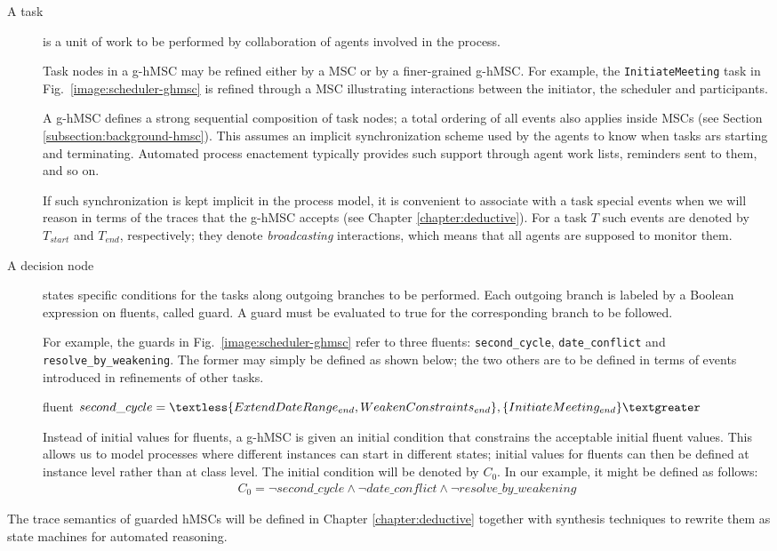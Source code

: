 \begin{description}

\item[A task] is a unit of work to be performed by collaboration of agents involved in the process. 

Task nodes in a g-hMSC may be refined either by a MSC or by a finer-grained g-hMSC. For example, the \texttt{InitiateMeeting} task in Fig.~\ref{image:scheduler-ghmsc} is refined through a MSC illustrating interactions between the initiator, the scheduler and participants. 

A g-hMSC defines a strong sequential composition of task nodes; a total ordering of all events also applies inside MSCs (see Section \ref{subsection:background-hmsc}). This assumes an implicit synchronization scheme used by the agents to know when tasks ars starting and terminating. Automated process enactement typically provides such support through agent work lists, reminders sent to them, and so on. 

If such synchronization is kept implicit in the process model, it is convenient to associate with a task special events when we will reason in terms of the traces that the g-hMSC accepts (see Chapter \ref{chapter:deductive}). For a task $T$ such events are denoted by $T_{start}$ and $T_{end}$, respectively; they denote \emph{broadcasting} interactions, which means that all agents are supposed to monitor them. 

\item[A decision node] states specific conditions for the tasks along outgoing branches to be performed. Each outgoing branch is labeled by a Boolean expression on fluents, called guard. A guard must be evaluated to true for the corresponding branch to be followed.

For example, the guards in Fig.~\ref{image:scheduler-ghmsc} refer to three fluents: \texttt{second\_cycle}, \texttt{date\_conflict} and \texttt{resolve\_by\_weakening}. The former may simply be defined as shown below; the two others are to be defined in terms of events introduced in refinements of other tasks.
\begin{center}
fluent $second\_cycle = \textless \{ ExtendDateRange_{end}, \newline WeakenConstraints_{end} \},
 \{ InitiateMeeting_{end} \} \textgreater $\\
\end{center}

Instead of initial values for fluents, a g-hMSC is given an initial condition that constrains the acceptable initial fluent values. This allows us to model processes where different instances can start in different states; initial values for fluents can then be defined at instance level rather than at class level. The initial condition will be denoted by $C_0$. In our example, it might be defined as follows:
\begin{align*}
C_0 = \neg second\_cycle \wedge \neg date\_conflict \wedge \neg resolve\_by\_weakening
\end{align*}

\end{description} 

The trace semantics of guarded hMSCs will be defined in Chapter \ref{chapter:deductive} together with synthesis techniques to rewrite them as state machines for automated reasoning.
